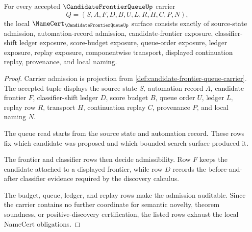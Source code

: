 \begin{theorem}
\label{thm:candidate-frontier-queue-namecert-obligations}
For every accepted $\CandidateFrontierQueueUp$ carrier
$$
Q=(S,A,F,D,B,U,L,R,H,C,P,N),
$$
the local $\NameCert_{\CandidateFrontierQueueUp}$ surface consists exactly of source-state admission, automation-record admission, candidate-frontier exposure, classifier-shift ledger exposure, score-budget exposure, queue-order exposure, ledger exposure, replay exposure, componentwise transport, displayed continuation replay, provenance, and local naming.
\end{theorem}
\begin{proof}
Carrier admission is projection from \autoref{def:candidate-frontier-queue-carrier}. The accepted tuple displays the source state $S$, automation record $A$, candidate frontier $F$, classifier-shift ledger $D$, score budget $B$, queue order $U$, ledger $L$, replay row $R$, transport $H$, continuation replay $C$, provenance $P$, and local naming $N$.

The queue read starts from the source state and automation record. These rows fix which candidate was proposed and which bounded search surface produced it.

The frontier and classifier rows then decide admissibility. Row $F$ keeps the candidate attached to a displayed frontier, while row $D$ records the before-and-after classifier evidence required by the discovery calculus.

The budget, queue, ledger, and replay rows make the admission auditable. Since the carrier contains no further coordinate for semantic novelty, theorem soundness, or positive-discovery certification, the listed rows exhaust the local NameCert obligations.
\end{proof}

